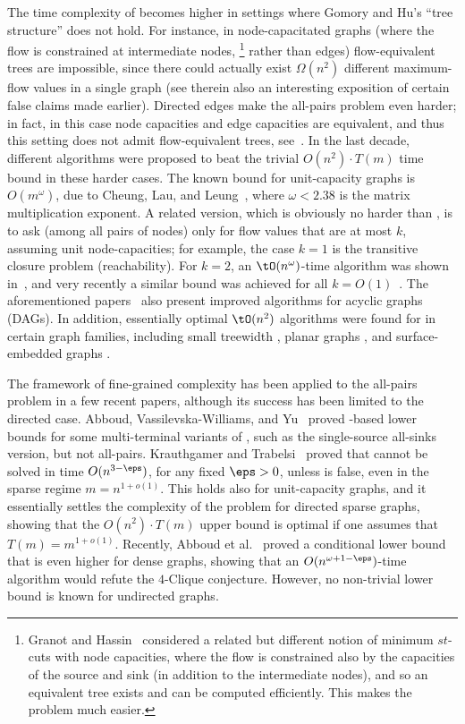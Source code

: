 The time complexity of \APMF becomes higher in settings
where Gomory and Hu's ``tree structure'' \cite{GH61} does not hold.
For instance, in node-capacitated graphs
(where the flow is constrained at intermediate nodes,%
\footnote{Granot and Hassin~\cite{GH86} considered
  a related but different notion of minimum $st$-cuts with node capacities,
  where the flow is constrained also by the capacities of the source and sink (in addition to
the  %
intermediate nodes), and so an equivalent tree exists and can be computed efficiently.
%
%
%
%
  This makes the problem much easier.
}
rather than edges) flow-equivalent trees are impossible,
since there could actually exist $\Omega(n^2)$ different maximum-flow values
in a single graph \cite{HL07} (see therein
also an interesting exposition of certain false claims made earlier).
Directed edges make the all-pairs problem even harder;
in fact, in this case node capacities and edge capacities are equivalent,
and thus this setting does not admit flow-equivalent trees,
see~\cite{Mayeda62,Jelinek63,HL07}.
In the last decade, different algorithms were proposed to beat the trivial $O(n^2)\cdot T(m)$ time bound in these harder cases.
The known bound for
%
unit-capacity graphs
is $O(m^\omega)$, due to Cheung, Lau, and Leung~\cite{CLL13},
where $\omega<2.38$ is the matrix multiplication exponent.
A related version, which is obviously no harder than \APMF,
is to ask (among all pairs of nodes) only for flow values that are at most $k$,
assuming unit node-capacities;
for example, the case $k=1$ is the transitive closure problem (reachability).
For $k=2$, an $\tO(n^\omega)$-time algorithm was shown in~\cite{G+17},
and very recently a similar bound was achieved for all $k=O(1)$~\cite{A+18}.
The aforementioned papers~\cite{CLL13,G+17,A+18}
also present improved algorithms for acyclic graphs (DAGs).
In addition, essentially optimal %
${\tO}(n^2)$    %
algorithms were found for \APMF in certain graph families,
including small treewidth \cite{ACZ98},
planar graphs \cite{LNSW12}, and
surface-embedded graphs \cite{BENW16}.


The framework of fine-grained complexity has been applied to the all-pairs problem in a few recent papers, although its success has been limited to the directed case.
Abboud, Vassilevska-Williams, and Yu~\cite{AVY15} proved \SETH-based lower bounds for some multi-terminal variants of \MF,
such as the single-source all-sinks version, but not all-pairs.
Krauthgamer and Trabelsi~\cite{KT18} proved that \APMF cannot be solved
in time $O(n^{3-\eps})$, for any fixed $\eps>0$, unless \SETH is false,
even in the sparse regime $m = n^{1+o(1)}$.
This holds also for unit-capacity graphs, and it essentially settles the complexity of the problem for directed sparse graphs, showing that the $O(n^2 )\cdot T(m)$ upper bound is optimal if one assumes that $T(m) = m^{1+o(1)}$.
Recently, Abboud et al.~\cite{A+18} proved a conditional lower bound that
is even higher for dense graphs,
showing that an $O(n^{\omega+1-\eps})$-time algorithm
would refute the $4$-Clique conjecture.
However, no non-trivial lower bound is known for undirected graphs.


